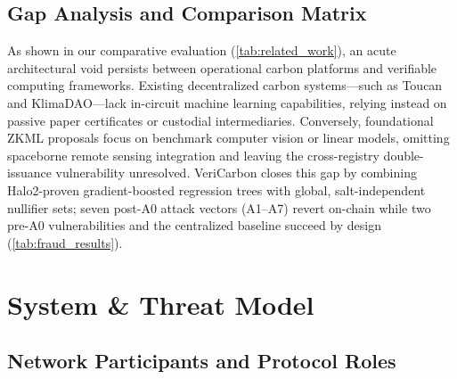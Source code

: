 \documentclass[preprint,12pt]{elsarticle}
\begin{document}
\subsection{Gap Analysis and Comparison Matrix}

As shown in our comparative evaluation (\autoref{tab:related_work}), an acute architectural void persists between operational carbon platforms and verifiable computing frameworks. Existing decentralized carbon systems—such as Toucan and KlimaDAO—lack in-circuit machine learning capabilities, relying instead on passive paper certificates or custodial intermediaries. Conversely, foundational ZKML proposals \cite{liu2021zkcnn,weng2021mystique,kang2022scaling} focus on benchmark computer vision or linear models, omitting spaceborne remote sensing integration and leaving the cross-registry double-issuance vulnerability unresolved. VeriCarbon closes this gap by combining Halo2-proven gradient-boosted regression trees with global, salt-independent nullifier sets; seven post-A0 attack vectors (A1–A7) revert on-chain while two pre-A0 vulnerabilities and the centralized baseline succeed by design (\autoref{tab:fraud_results}).




\section{System \& Threat Model}

\subsection{Network Participants and Protocol Roles}
\end{document}

